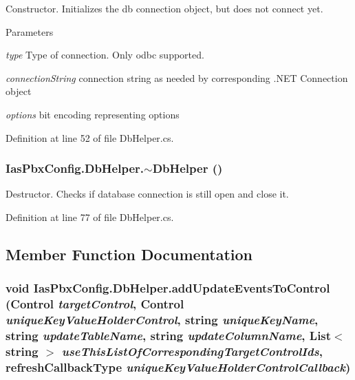 Constructor. Initializes the db connection object, but does not connect yet. 
\begin{DoxyParams}{Parameters}
\item[{\em type}]Type of connection. Only odbc supported. \item[{\em connectionString}]connection string as needed by corresponding .NET Connection object \item[{\em options}]bit encoding representing options \end{DoxyParams}


Definition at line 52 of file DbHelper.cs.\hypertarget{class_ias_pbx_config_1_1_db_helper_a0bf0a2cea3701b5ab736c9da279c6ec3}{
\subsubsection[{$\sim$DbHelper}]{\setlength{\rightskip}{0pt plus 5cm}IasPbxConfig.DbHelper.$\sim$DbHelper ()}}
\label{class_ias_pbx_config_1_1_db_helper_a0bf0a2cea3701b5ab736c9da279c6ec3}


Destructor. Checks if database connection is still open and close it. 

Definition at line 77 of file DbHelper.cs.

\subsection{Member Function Documentation}
\hypertarget{class_ias_pbx_config_1_1_db_helper_a25ba7bab44135f537dbee9d82952cb10}{
\subsubsection[{addUpdateEventsToControl}]{\setlength{\rightskip}{0pt plus 5cm}void IasPbxConfig.DbHelper.addUpdateEventsToControl (Control {\em targetControl}, \/  Control {\em uniqueKeyValueHolderControl}, \/  string {\em uniqueKeyName}, \/  string {\em updateTableName}, \/  string {\em updateColumnName}, \/  List$<$ string $>$ {\em useThisListOfCorrespondingTargetControlIds}, \/  refreshCallbackType {\em uniqueKeyValueHolderControlCallback})}}
\label{class_ias_pbx_config_1_1_db_helper_a25ba7bab44135f537dbee9d82952cb10}


